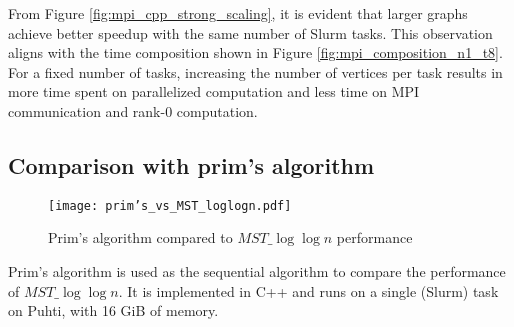 \documentclass[english, 12pt, a4paper, elec, utf8, a-2b, online]{aaltothesis}
\newcommand{\mstalgo}{$MST\_\log\log{n}$}
\begin{document}
From Figure \cref{fig:mpi_cpp_strong_scaling}, it is evident that larger graphs achieve better speedup with the same number of Slurm tasks. This observation aligns with the time composition shown in Figure \cref{fig:mpi_composition_n1_t8}. For a fixed number of tasks, increasing the number of vertices per task results in more time spent on parallelized computation and less time on MPI communication and rank-0 computation.




\subsection{Comparison with prim's algorithm}
\begin{figure}[h]
	\centering
		\texttt{[image: prim's\_vs\_MST\_loglogn.pdf]}
	\caption{Prim's algorithm compared to \mstalgo{} performance}
	\label{fig:prims_vs_MST_loglogn}
\end{figure}
Prim's algorithm is used as the sequential algorithm to compare the performance of \mstalgo{}. It is implemented in C++ and runs on a single (Slurm) task on Puhti, with 16 GiB of memory.
\end{document}
